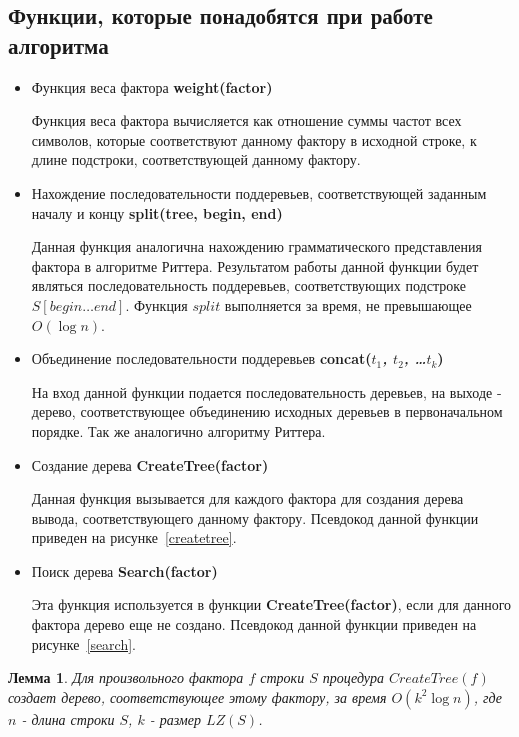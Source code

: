 \documentclass[12pt,a4paper]{extarticle}
\theoremstyle{break}
\newtheorem{lemma}{Лемма}
\begin{document}
\subsection{Функции, которые понадобятся при работе алгоритма}

\begin{itemize}
\item Функция веса фактора \textbf{weight(factor)}

Функция веса фактора вычисляется как отношение суммы частот всех символов,
которые соответствуют данному фактору в исходной строке, к длине подстроки,
соответствующей данному фактору. 

\item Нахождение последовательности поддеревьев, соответствующей
заданным началу и концу \textbf{split(tree, begin, end)}

Данная функция аналогична нахождению грамматического представления фактора в
алгоритме Риттера. Результатом работы данной функции будет являться
последовательность поддеревьев, соответствующих подстроке $S[begin\ldots end]$.
Функция $split$ выполняется за время, не превышающее $O(\log n)$.

\item Объединение последовательности поддеревьев \textbf{concat(\emph{$t_{1}$, $t_{2}$, \ldots $t_{k}$})} 

На вход данной функции подается последовательность
деревьев, на выходе - дерево, соответствующее объединению исходных деревьев в
первоначальном порядке. Так же аналогично алгоритму Риттера.

\item Создание дерева \textbf{CreateTree(factor)}

Данная функция вызывается для каждого фактора для создания дерева вывода,
соответствующего данному фактору. Псевдокод данной функции приведен
на рисунке~\ref{createtree}.

\item Поиск дерева \textbf{Search(factor)}

Эта функция используется в функции \textbf{CreateTree(factor)}, если для данного
фактора дерево еще не создано. Псевдокод данной функции приведен
на рисунке~\ref{search}.

\end{itemize}

\begin{lemma}
Для произвольного фактора $f$ строки $S$ процедура
$CreateTree(f)$ создает дерево, соответствующее этому фактору, за время
$O(k^2\log n)$, где $n$ - длина строки $S$, $k$ - размер $LZ(S)$.
\end{lemma} 
\end{document}
